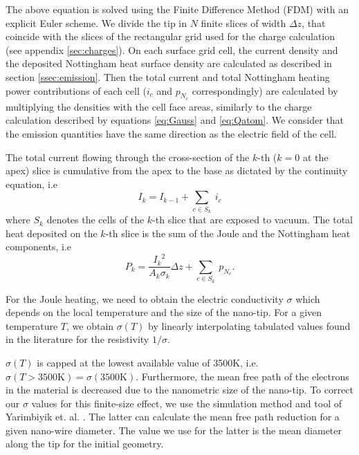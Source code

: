 \documentclass[%
 aps,
 prb,%
 amsmath,amssymb,
reprint,%
superscriptaddress,
]{revtex4-1}
\begin{document}
The above equation is solved using the Finite Difference Method (FDM) with an explicit Euler scheme.
We divide the tip in $N$ finite slices of width $\Delta z$, that coincide with the slices of the rectangular grid used for the charge calculation (see appendix \ref{sec:charges}).
On each surface grid cell, the current density and the deposited Nottingham heat surface density are calculated as described in section \ref{ssec:emission}.
Then the total current and total Nottingham heating power contributions of each cell ($i_c$ and $p_{N_c}$ correspondingly) are calculated by multiplying the densities with the cell face areas, similarly to the charge calculation described by equations \eqref{eq:Gauss} and \eqref{eq:Qatom}.
We consider that the emission quantities have the same direction as the electric field of the cell.

The total current flowing through the cross-section of the $k$-th ($k=0$ at the apex) slice is cumulative from the apex to the base as dictated by the continuity equation, i.e
\begin{equation}
	I_k = I_{k-1} + \sum_{c \in S_k}~i_c
\end{equation}
where $S_k$ denotes the cells of the $k$-th slice that are exposed to vacuum.
The total heat deposited on the $k$-th slice is the sum of the Joule and the Nottingham heat components, i.e 
\begin{equation}
	\label{eq:power}
	P_k = \frac{{I_k}^2}{A_k \sigma_k} \Delta z + \sum_{c \in S_k}~p_{N_c} \textrm{.}
\end{equation}

For the Joule heating, we need to obtain the electric conductivity $\sigma$ which depends on the local temperature and the size of the nano-tip.
For a given temperature $T$, we obtain $\sigma(T)$ by linearly interpolating tabulated values found in the literature \cite{Matula1979,Gathers1983} for the resistivity $1/ \sigma$.

$\sigma(T)$ is capped at the lowest available value of 3500K, i.e. $\sigma(T>3500\textrm{K})=\sigma(3500\textrm{K})$. 
Furthermore, the mean free path of the electrons in the material is decreased due to the nanometric size of the nano-tip.
To correct our $\sigma$ values for this finite-size effect, we use the simulation method and tool of Yarimbiyik et. al. \cite{Yarimbiyik2005}.
The latter can calculate the mean free path reduction for a given nano-wire diameter.
The value we use for the latter is the mean diameter along the tip for the initial geometry. 
\end{document}
